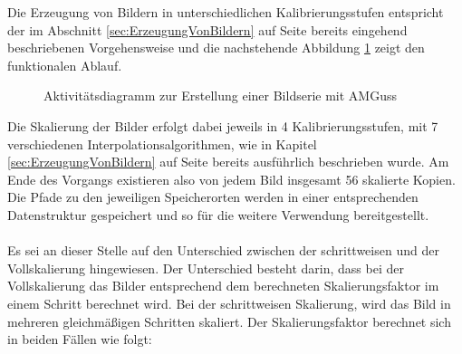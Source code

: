 \documentclass[
fontsize=10pt, 
listof = totoc,
parskip = half	
]{report}
\begin{document}
Die Erzeugung von Bildern in unterschiedlichen Kalibrierungsstufen entspricht der im Abschnitt \ref{sec:ErzeugungVonBildern} auf Seite \pageref{sec:ErzeugungVonBildern} bereits eingehend beschriebenen Vorgehensweise und die nachstehende Abbildung \ref{fig:Bildskalierung} zeigt den funktionalen Ablauf.

\begin{figure}[H]
	\centering
	\caption{Aktivitätsdiagramm zur Erstellung einer Bildserie mit AMGuss}
	\label{fig:Bildskalierung}
\end{figure}

\noindent Die Skalierung der Bilder erfolgt dabei jeweils in 4 Kalibrierungsstufen, mit 7 verschiedenen Interpolationsalgorithmen, wie in Kapitel \ref{sec:ErzeugungVonBildern} auf Seite \pageref{sec:ErzeugungVonBildern} bereits ausführlich beschrieben wurde. Am Ende des Vorgangs existieren also von jedem Bild insgesamt 56 skalierte Kopien. Die Pfade zu den jeweiligen Speicherorten werden in einer entsprechenden Datenstruktur gespeichert und so für die weitere Verwendung bereitgestellt.
\\\\
Es sei an dieser Stelle auf den Unterschied zwischen der schrittweisen und der Vollskalierung hingewiesen. Der Unterschied besteht darin, dass bei der Vollskalierung das Bilder entsprechend dem berechneten Skalierungsfaktor im  einem Schritt berechnet wird. Bei der schrittweisen Skalierung, wird das Bild in mehreren gleichmäßigen Schritten skaliert. Der Skalierungsfaktor berechnet sich in beiden Fällen wie folgt:
\end{document}
